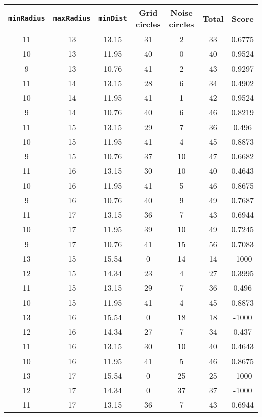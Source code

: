 \documentclass[letterpaper, 12pt]{article}
\begin{document}
\begin{longtable}{|c|c|c|c|c|c|c|}
\hline
\textbf{\texttt{minRadius}} & \textbf{\texttt{maxRadius}} & \textbf{\texttt{minDist}} & \textbf{Grid circles} & \textbf{Noise circles} & \textbf{Total} & \textbf{Score} \\
\hline
11 & 13 & 13.15 & 31 & 2 & 33 & 0.6775 \\
\hline
10 & 13 & 11.95 & 40 & 0 & 40 & 0.9524 \\
\hline
9 & 13 & 10.76 & 41 & 2 & 43 & 0.9297 \\
\hline
11 & 14 & 13.15 & 28 & 6 & 34 & 0.4902 \\
\hline
10 & 14 & 11.95 & 41 & 1 & 42 & 0.9524 \\
\hline
9 & 14 & 10.76 & 40 & 6 & 46 & 0.8219 \\
\hline
11 & 15 & 13.15 & 29 & 7 & 36 & 0.496 \\
\hline
10 & 15 & 11.95 & 41 & 4 & 45 & 0.8873 \\
\hline
9 & 15 & 10.76 & 37 & 10 & 47 & 0.6682 \\
\hline
11 & 16 & 13.15 & 30 & 10 & 40 & 0.4643 \\
\hline
10 & 16 & 11.95 & 41 & 5 & 46 & 0.8675 \\
\hline
9 & 16 & 10.76 & 40 & 9 & 49 & 0.7687 \\
\hline
11 & 17 & 13.15 & 36 & 7 & 43 & 0.6944 \\
\hline
10 & 17 & 11.95 & 39 & 10 & 49 & 0.7245 \\
\hline
9 & 17 & 10.76 & 41 & 15 & 56 & 0.7083 \\
\hline
13 & 15 & 15.54 & 0 & 14 & 14 & -1000 \\
\hline
12 & 15 & 14.34 & 23 & 4 & 27 & 0.3995 \\
\hline
11 & 15 & 13.15 & 29 & 7 & 36 & 0.496 \\
\hline
10 & 15 & 11.95 & 41 & 4 & 45 & 0.8873 \\
\hline
13 & 16 & 15.54 & 0 & 18 & 18 & -1000 \\
\hline
12 & 16 & 14.34 & 27 & 7 & 34 & 0.437 \\
\hline
11 & 16 & 13.15 & 30 & 10 & 40 & 0.4643 \\
\hline
10 & 16 & 11.95 & 41 & 5 & 46 & 0.8675 \\
\hline
13 & 17 & 15.54 & 0 & 25 & 25 & -1000 \\
\hline
12 & 17 & 14.34 & 0 & 37 & 37 & -1000 \\
\hline
11 & 17 & 13.15 & 36 & 7 & 43 & 0.6944 \\

\end{longtable}
\end{document}
